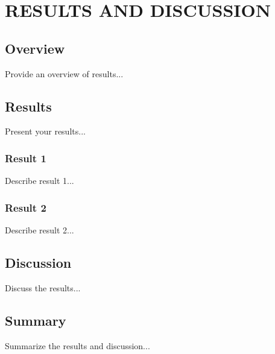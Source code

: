 
\chapter{RESULTS AND DISCUSSION}

\ifpdf
    \graphicspath{{results_discussion/figures/PNG}{results_discussion/figures/PDF}{results_discussion/figures}}
\else
    \graphicspath{{results_discussion/figures/EPS}{results_discussion/figures}}
\fi

\section{Overview}
Provide an overview of results...

\section{Results}
Present your results...

\subsection{Result 1}
Describe result 1...

\subsection{Result 2}
Describe result 2...

\section{Discussion}
Discuss the results...

\section{Summary}
Summarize the results and discussion...
